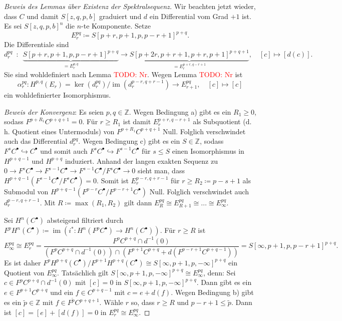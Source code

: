 \documentclass[11pt, a4paper, german]{article}
\theoremstyle{definition}
\theoremstyle{remark}
\newcommand{\TODO}[1]{\textcolor{red}{TODO: #1}} %
\newcommand{\Z}{\mathbb{Z}} %
\DeclareMathOperator{\im}{im} %
\renewcommand{\dh}{d.\,h.} %
\begin{document}
\begin{proof}[Beweis des Lemmas über Existenz der Spektralsequenz]
  Wir beachten jetzt wieder, dass $C$ und damit $S[z, q, p, b]$ graduiert und $d$ ein Differential vom Grad $+1$ ist.
  Es sei $S[z, q, p, b]^n$ die $n$-te Komponente.
  Setze
  \[ E_r^{pq} \coloneqq S[p\!+\!r, p\!+\!1, p, p\!-\!r\!+\!1]^{p+q}. \]
  Die Differentiale sind
  \[
    d_r^{pq}
    \enspace : \enspace
    \underbrace{S[p\!+\!r, p\!+\!1, p, p\!-\!r\!+\!1]^{p+q}}_{= E_r^{p,q}} \to \underbrace{S[p\!+\!2r, p\!+\!r\!+\!1, p\!+\!r, p\!+\!1]^{p+q+1}}_{= E_r^{p+r,q-r+1}}, \quad
    [c] \mapsto [d(c)].
  \]
  Sie sind wohldefiniert nach Lemma \TODO{Nr}.
  Wegen Lemma \TODO{Nr} ist
  \[
    \alpha_r^{pq} : H^{p,q}(E_r) = \ker(d^{pq}_r) / \im(d^{p-r,q+r-1}_r) \to E_{r+1}^{pq}, \quad
    [c] \mapsto [c]
  \]
  ein wohldefinierter Isomorphismus.

  \emph{Beweis der Konvergenz}:
  Es seien $p, q \in \Z$.
  Wegen Bedingung a) gibt es ein $R_1 \geq 0$, sodass $F^{p+R_1} C^{p+q+1} = 0$.
  Für $r \geq R_1$ ist damit $E^{p+r,q-r+1}_r$ als Subquotient (\dh{} Quotient eines Untermoduls) von $F^{p+R_1} C^{p+q+1}$ Null.
  Folglich verschwindet auch das Differential $d_r^{pq}$.
  Wegen Bedingung c) gibt es ein $S \in \Z$, sodass $F^s C^\bullet \hookrightarrow C^\bullet$ und somit auch $F^s C^\bullet \hookrightarrow F^{s-1} C^\bullet$ für $s \leq S$ einen Isomorphismus in $H^{p+q-1}$ und $H^{p+q}$ induziert.
  Anhand der langen exakten Sequenz zu $0 \to F^s C^\bullet \to F^{s-1} C^\bullet \to F^{s-1} C^\bullet / F^s C^\bullet \to 0$ sieht man, dass $H^{p+q-1}(F^{s-1} C^\bullet / F^s C^\bullet) = 0$.
  Somit ist $E_r^{p-r,q+r-1}$ für $r \geq R_2 \coloneqq p - s + 1$ als Submodul von $H^{p+q-1}(F^{p-r} C^\bullet / F^{p-r+1} C^\bullet)$ Null.
  Folglich verschwindet auch $d_r^{p-r,q+r-1}$.
  Mit $R \coloneqq \max(R_1, R_2)$ gilt dann $E^{pq}_R \cong E^{pq}_{R+1} \cong \ldots \cong E^{pq}_\infty$.

  Sei $H^n(C^\bullet)$ absteigend filtriert durch $F^p H^n(C^\bullet) \coloneqq \im(i^* : H^n(F^p C^\bullet) \to H^n(C^\bullet))$.
  Für $r \geq R$ ist
  \[ E^{pq}_\infty \cong E^{pq}_r = \frac{F^p C^{p+q} \cap d^{-1}(0)}{(F^p C^{p+q} \cap d^{-1}(0)) \cap (F^{p+1} C^{p+q} + d(F^{p-r+1} C^{p+q-1}))} = S[\infty,p+1,p,p-r+1]^{p+q}. \]
  Es ist daher $F^p H^{p+q}(C^\bullet) / F^{p+1} H^{p+q}(C^\bullet) \cong S[\infty, p+1, p, -\infty]^{p+q}$ ein Quotient von $E^{pq}_\infty$.
  Tatsächlich gilt $S[\infty, p+1, p, -\infty]^{p+q} \cong E^{pq}_\infty$, denn:
  Sei $c \in F^p C^{p+q} \cap d^{-1}(0)$ mit $[c] = 0$ in $S[\infty, p+1, p, -\infty]^{p+q}$.
  Dann gibt es ein $e \in F^{p+1} C^{p+q}$ und ein $f \in C^{p+q-1}$ mit $c = e + d(f)$.
  Wegen Bedingung b) gibt es ein $\tilde{p} \in \Z$ mit $f \in F^{\tilde{p}} C^{p+q+1}$.
  Wähle $r$ so, dass $r \geq R$ und $p-r+1 \leq \tilde{p}$.
  Dann ist $[c] = [e]+[d(f)] = 0$ in $E^{pq}_r \cong E^{pq}_\infty$.
\end{proof}
\end{document}
